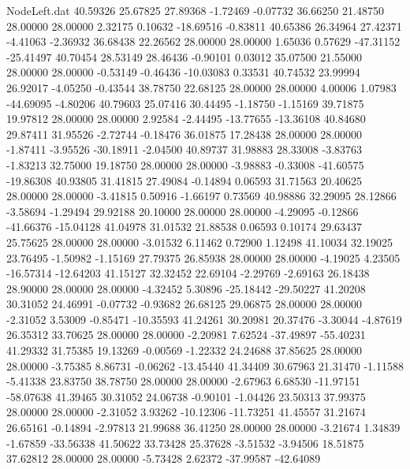\begin{filecontents}{NodeLeft.dat}
  40.59326   25.67825   27.89368    -1.72469   -0.07732   36.66250   21.48750   28.00000   28.00000    2.32175    0.10632  -18.69516   -0.83811
  40.65386   26.34964   27.42371    -4.41063   -2.36932   36.68438   22.26562   28.00000   28.00000    1.65036    0.57629  -47.31152  -25.41497
  40.70454   28.53149   28.46436    -0.90101    0.03012   35.07500   21.55000   28.00000   28.00000   -0.53149   -0.46436  -10.03083    0.33531
  40.74532   23.99994   26.92017    -4.05250   -0.43544   38.78750   22.68125   28.00000   28.00000    4.00006    1.07983  -44.69095   -4.80206
  40.79603   25.07416   30.44495    -1.18750   -1.15169   39.71875   19.97812   28.00000   28.00000    2.92584   -2.44495  -13.77655  -13.36108
  40.84680   29.87411   31.95526    -2.72744   -0.18476   36.01875   17.28438   28.00000   28.00000   -1.87411   -3.95526  -30.18911   -2.04500
  40.89737   31.98883   28.33008    -3.83763   -1.83213   32.75000   19.18750   28.00000   28.00000   -3.98883   -0.33008  -41.60575  -19.86308
  40.93805   31.41815   27.49084    -0.14894    0.06593   31.71563   20.40625   28.00000   28.00000   -3.41815    0.50916   -1.66197    0.73569
  40.98886   32.29095   28.12866    -3.58694   -1.29494   29.92188   20.10000   28.00000   28.00000   -4.29095   -0.12866  -41.66376  -15.04128
  41.04978   31.01532   21.88538     0.06593    0.10174   29.63437   25.75625   28.00000   28.00000   -3.01532    6.11462    0.72900    1.12498
  41.10034   32.19025   23.76495    -1.50982   -1.15169   27.79375   26.85938   28.00000   28.00000   -4.19025    4.23505  -16.57314  -12.64203
  41.15127   32.32452   22.69104    -2.29769   -2.69163   26.18438   28.90000   28.00000   28.00000   -4.32452    5.30896  -25.18442  -29.50227
  41.20208   30.31052   24.46991    -0.07732   -0.93682   26.68125   29.06875   28.00000   28.00000   -2.31052    3.53009   -0.85471  -10.35593
  41.24261   30.20981   20.37476    -3.30044   -4.87619   26.35312   33.70625   28.00000   28.00000   -2.20981    7.62524  -37.49897  -55.40231
  41.29332   31.75385   19.13269    -0.00569   -1.22332   24.24688   37.85625   28.00000   28.00000   -3.75385    8.86731   -0.06262  -13.45440
  41.34409   30.67963   21.31470    -1.11588   -5.41338   23.83750   38.78750   28.00000   28.00000   -2.67963    6.68530  -11.97151  -58.07638
  41.39465   30.31052   24.06738    -0.90101   -1.04426   23.50313   37.99375   28.00000   28.00000   -2.31052    3.93262  -10.12306  -11.73251
  41.45557   31.21674   26.65161    -0.14894   -2.97813   21.99688   36.41250   28.00000   28.00000   -3.21674    1.34839   -1.67859  -33.56338
  41.50622   33.73428   25.37628    -3.51532   -3.94506   18.51875   37.62812   28.00000   28.00000   -5.73428    2.62372  -37.99587  -42.64089

\end{filecontents}
